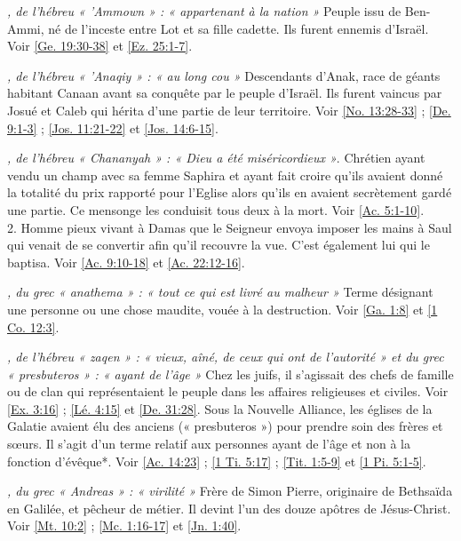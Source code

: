 \begin{multicols}{2}
\textit{, de l'hébreu « 'Ammown » : « appartenant à la nation »}\newline
Peuple issu de Ben-Ammi, né de l'inceste entre Lot et sa fille cadette. Ils furent ennemis d'Israël. Voir \vref{Ge. 19:30-38} et \vref{Ez. 25:1-7}.

\textit{, de l'hébreu « 'Anaqiy » : « au long cou »}\newline
Descendants d'Anak, race de géants habitant Canaan avant sa conquête par le peuple d'Israël. Ils furent vaincus par Josué et Caleb qui hérita d'une partie de leur territoire. Voir \vref{No. 13:28-33} ; \vref{De. 9:1-3} ; \vref{Jos. 11:21-22} et \vref{Jos. 14:6-15}.

\textit{, de l'hébreu « Chananyah » : « Dieu a été miséricordieux »}. Chrétien ayant vendu un champ avec sa femme Saphira et ayant fait croire qu'ils avaient donné la totalité du prix rapporté pour l'Eglise alors qu'ils en avaient secrètement gardé une partie. Ce mensonge les conduisit tous deux à la mort. Voir \vref{Ac. 5:1-10}.
\\2. Homme pieux vivant à Damas que le Seigneur envoya imposer les mains à Saul qui venait de se convertir afin qu'il recouvre la vue. C'est également lui qui le baptisa. Voir \vref{Ac. 9:10-18} et \vref{Ac. 22:12-16}.

\textit{, du grec « anathema » : « tout ce qui est livré au malheur »}\newline
Terme désignant une personne ou une chose maudite, vouée à la destruction. Voir \vref{Ga. 1:8} et \vref{1 Co. 12:3}.

\textit{, de l'hébreu « zaqen » : « vieux, aîné, de ceux qui ont de l'autorité » et du grec « presbuteros » : « ayant de l'âge »}\newline
Chez les juifs, il s'agissait des chefs de famille ou de clan qui représentaient le peuple dans les affaires religieuses et civiles. Voir \vref{Ex. 3:16} ; \vref{Lé. 4:15} et \vref{De. 31:28}. Sous la Nouvelle Alliance, les églises de la Galatie avaient élu des anciens (« presbuteros ») pour prendre soin des frères et sœurs. Il s'agit d'un terme relatif aux personnes ayant de l'âge et non à la fonction d'évêque*. Voir \vref{Ac. 14:23} ; \vref{1 Ti. 5:17} ; \vref{Tit. 1:5-9} et \vref{1 Pi. 5:1-5}.

\textit{, du grec « Andreas » : « virilité »}\newline
Frère de Simon Pierre, originaire de Bethsaïda en Galilée, et pêcheur de métier. Il devint l'un des douze apôtres de Jésus-Christ. Voir \vref{Mt. 10:2} ; \vref{Mc. 1:16-17} et \vref{Jn. 1:40}.


\end{multicols}
